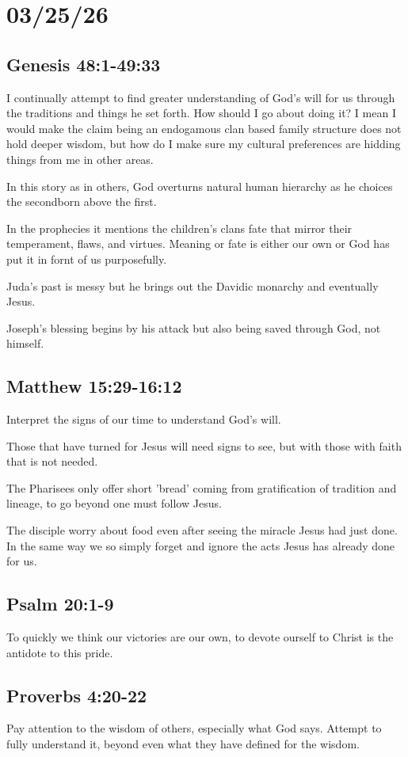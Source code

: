\section{03/25/26}
\subsection{Genesis 48:1-49:33}
I continually attempt to find greater understanding of God's will for us through the
traditions and things he set forth. How should I go about doing it? I mean I would
make the claim being an endogamous clan based family structure does not hold
deeper wisdom, but how do I make sure my cultural preferences are hidding things from me in other areas.

In this story as in others, God overturns natural human hierarchy as he choices the secondborn above the first.

In the prophecies it mentions the children's clans fate that mirror their temperament, flaws, and virtues. Meaning or fate is either our own or God has put it in fornt of us
purposefully.

Juda's past is messy but he brings out the Davidic monarchy and eventually Jesus.

Joseph's blessing begins by his attack but also being saved through God, not himself.

\subsection{Matthew 15:29-16:12}
Interpret the signs of our time to understand God's will.

Those that have turned for Jesus will need signs to see, but with those with faith that is not needed.

The Pharisees only offer short 'bread' coming from gratification of tradition and lineage, to go beyond one must follow Jesus.

The disciple worry about food even after seeing the miracle Jesus had just done. In the same way we so simply forget and ignore the acts Jesus has already done for us.

\subsection{Psalm 20:1-9}
To quickly we think our victories are our own, to devote ourself to Christ is the antidote to this pride.

\subsection{Proverbs 4:20-22}
Pay attention to the wisdom of others, especially what God says. Attempt to fully understand it, beyond even what they have defined for the wisdom.

